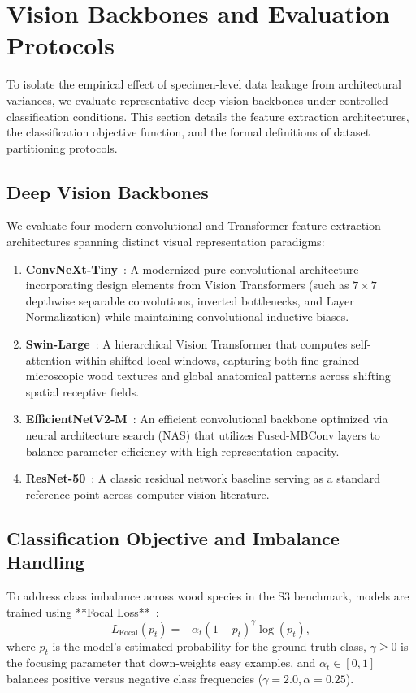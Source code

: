 \section{Vision Backbones and Evaluation Protocols}

To isolate the empirical effect of specimen-level data leakage from architectural variances, we evaluate representative deep vision backbones under controlled classification conditions. This section details the feature extraction architectures, the classification objective function, and the formal definitions of dataset partitioning protocols.

\subsection{Deep Vision Backbones}
We evaluate four modern convolutional and Transformer feature extraction architectures spanning distinct visual representation paradigms:

\begin{enumerate}[label=\textbf{(\arabic*)}, leftmargin=*]
\item \textbf{ConvNeXt-Tiny}~\cite{convnext}: A modernized pure convolutional architecture incorporating design elements from Vision Transformers (such as $7\times 7$ depthwise separable convolutions, inverted bottlenecks, and Layer Normalization) while maintaining convolutional inductive biases.
\item \textbf{Swin-Large}~\cite{swin}: A hierarchical Vision Transformer that computes self-attention within shifted local windows, capturing both fine-grained microscopic wood textures and global anatomical patterns across shifting spatial receptive fields.
\item \textbf{EfficientNetV2-M}~\cite{efficientnetv2}: An efficient convolutional backbone optimized via neural architecture search (NAS) that utilizes Fused-MBConv layers to balance parameter efficiency with high representation capacity.
\item \textbf{ResNet-50}~\cite{resnet}: A classic residual network baseline serving as a standard reference point across computer vision literature.
\end{enumerate}

\subsection{Classification Objective and Imbalance Handling}
To address class imbalance across wood species in the S3 benchmark, models are trained using **Focal Loss**~\cite{focal}:
\begin{equation}
L_{\mathrm{Focal}}(p_t) = -\alpha_t (1 - p_t)^\gamma \log(p_t),
\end{equation}
where $p_t$ is the model's estimated probability for the ground-truth class, $\gamma \ge 0$ is the focusing parameter that down-weights easy examples, and $\alpha_t \in [0, 1]$ balances positive versus negative class frequencies ($\gamma = 2.0, \alpha = 0.25$).

